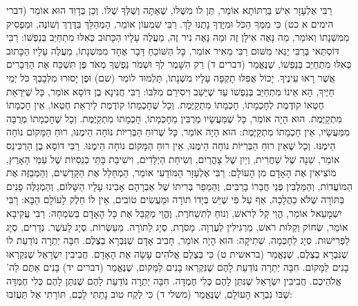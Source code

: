 רַבִּי אֶלְעָזָר אִישׁ בַּרְתּוֹתָא אוֹמֵר, תֶּן לוֹ מִשֶּׁלּוֹ, שֶׁאַתָּה וְשֶׁלְּךָ שֶׁלּוֹ. וְכֵן בְּדָוִד הוּא אוֹמֵר (דברי הימים א כט) כִּי מִמְּךָ הַכֹּל וּמִיָּדְךָ נָתַנּוּ לָךְ. רַבִּי שִׁמְעוֹן אוֹמֵר, הַמְהַלֵּךְ בַּדֶּרֶךְ וְשׁוֹנֶה, וּמַפְסִיק מִמִּשְׁנָתוֹ וְאוֹמֵר, מַה נָּאֶה אִילָן זֶה וּמַה נָּאֶה נִיר זֶה, מַעֲלֶה עָלָיו הַכָּתוּב כְּאִלּוּ מִתְחַיֵּב בְּנַפְשׁוֹ:
רַבִּי דּוֹסְתַּאי בְּרַבִּי יַנַּאי מִשּׁוּם רַבִּי מֵאִיר אוֹמֵר, כָּל הַשּׁוֹכֵחַ דָּבָר אֶחָד מִמִּשְׁנָתוֹ, מַעֲלֶה עָלָיו הַכָּתוּב כְּאִלּוּ מִתְחַיֵּב בְּנַפְשׁוֹ, שֶׁנֶּאֱמַר (דברים ד) רַק הִשָּׁמֶר לְךָ וּשְׁמֹר נַפְשְׁךָ מְאֹד פֶּן תִּשְׁכַּח אֶת הַדְּבָרִים אֲשֶׁר רָאוּ עֵינֶיךָ. יָכוֹל אֲפִלּוּ תָקְפָה עָלָיו מִשְׁנָתוֹ, תַּלְמוּד לוֹמַר (שם) וּפֶן יָסוּרוּ מִלְּבָבְךָ כֹּל יְמֵי חַיֶּיךָ, הָא אֵינוֹ מִתְחַיֵּב בְּנַפְשׁוֹ עַד שֶׁיֵּשֵׁב וִיסִירֵם מִלִּבּוֹ:
רַבִּי חֲנִינָא בֶן דּוֹסָא אוֹמֵר, כָּל שֶׁיִּרְאַת חֶטְאוֹ קוֹדֶמֶת לְחָכְמָתוֹ, חָכְמָתוֹ מִתְקַיֶּמֶת. וְכָל שֶׁחָכְמָתוֹ קוֹדֶמֶת לְיִרְאַת חֶטְאוֹ, אֵין חָכְמָתוֹ מִתְקַיֶּמֶת. הוּא הָיָה אוֹמֵר, כָּל שֶׁמַּעֲשָׂיו מְרֻבִּין מֵחָכְמָתוֹ, חָכְמָתוֹ מִתְקַיֶּמֶת. וְכָל שֶׁחָכְמָתוֹ מְרֻבָּה מִמַּעֲשָׂיו, אֵין חָכְמָתוֹ מִתְקַיֶּמֶת:
הוּא הָיָה אוֹמֵר, כָּל שֶׁרוּחַ הַבְּרִיּוֹת נוֹחָה הֵימֶנּוּ, רוּחַ הַמָּקוֹם נוֹחָה הֵימֶנּוּ. וְכָל שֶׁאֵין רוּחַ הַבְּרִיּוֹת נוֹחָה הֵימֶנּוּ, אֵין רוּחַ הַמָּקוֹם נוֹחָה הֵימֶנּוּ. רַבִּי דוֹסָא בֶן הַרְכִּינַס אוֹמֵר, שֵׁנָה שֶׁל שַׁחֲרִית, וְיַיִן שֶׁל צָהֳרַיִם, וְשִׂיחַת הַיְלָדִים, וִישִׁיבַת בָּתֵּי כְנֵסִיּוֹת שֶׁל עַמֵּי הָאָרֶץ, מוֹצִיאִין אֶת הָאָדָם מִן הָעוֹלָם:
רַבִּי אֶלְעָזָר הַמּוֹדָעִי אוֹמֵר, הַמְחַלֵּל אֶת הַקָּדָשִׁים, וְהַמְבַזֶּה אֶת הַמּוֹעֲדוֹת, וְהַמַּלְבִּין פְּנֵי חֲבֵרוֹ בָרַבִּים, וְהַמֵּפֵר בְּרִיתוֹ שֶׁל אַבְרָהָם אָבִינוּ עָלָיו הַשָּׁלוֹם, וְהַמְגַלֶּה פָנִים בַּתּוֹרָה שֶׁלֹּא כַהֲלָכָה, אַף עַל פִּי שֶׁיֵּשׁ בְּיָדוֹ תוֹרָה וּמַעֲשִׂים טוֹבִים, אֵין לוֹ חֵלֶק לָעוֹלָם הַבָּא:
רַבִּי יִשְׁמָעֵאל אוֹמֵר, הֱוֵי קַל לְרֹאשׁ, וְנוֹחַ לְתִשְׁחֹרֶת, וֶהֱוֵי מְקַבֵּל אֶת כָּל הָאָדָם בְּשִׂמְחָה:
רַבִּי עֲקִיבָא אוֹמֵר, שְׂחוֹק וְקַלּוּת רֹאשׁ, מַרְגִּילִין לְעֶרְוָה. מָסֹרֶת, סְיָג לַתּוֹרָה. מַעַשְׂרוֹת, סְיָג לָעשֶׁר. נְדָרִים, סְיָג לַפְּרִישׁוּת. סְיָג לַחָכְמָה, שְׁתִיקָה:
הוּא הָיָה אוֹמֵר, חָבִיב אָדָם שֶׁנִּבְרָא בְצֶלֶם. חִבָּה יְתֵרָה נוֹדַעַת לוֹ שֶׁנִּבְרָא בְצֶלֶם, שֶׁנֶּאֱמַר (בראשית ט) כִּי בְּצֶלֶם אֱלֹהִים עָשָׂה אֶת הָאָדָם. חֲבִיבִין יִשְׂרָאֵל שֶׁנִּקְרְאוּ בָנִים לַמָּקוֹם. חִבָּה יְתֵרָה נוֹדַעַת לָהֶם שֶׁנִּקְרְאוּ בָנִים לַמָּקוֹם, שֶׁנֶּאֱמַר (דברים יד) בָּנִים אַתֶּם לַה' אֱלֹהֵיכֶם. חֲבִיבִין יִשְׂרָאֵל שֶׁנִּתַּן לָהֶם כְּלִי חֶמְדָּה. חִבָּה יְתֵרָה נוֹדַעַת לָהֶם שֶׁנִּתַּן לָהֶם כְּלִי חֶמְדָּה שֶׁבּוֹ נִבְרָא הָעוֹלָם, שֶׁנֶּאֱמַר (משלי ד) כִּי לֶקַח טוֹב נָתַתִּי לָכֶם, תּוֹרָתִי אַל תַּעֲזֹבוּ:
